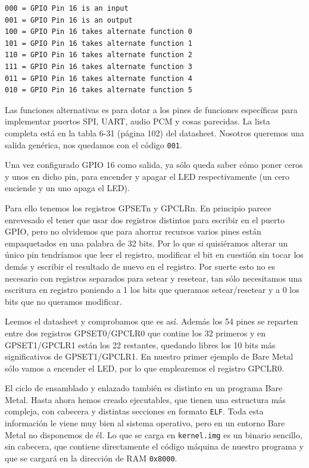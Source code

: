 \begin{lstlisting}
000 = GPIO Pin 16 is an input
001 = GPIO Pin 16 is an output
100 = GPIO Pin 16 takes alternate function 0
101 = GPIO Pin 16 takes alternate function 1
110 = GPIO Pin 16 takes alternate function 2
111 = GPIO Pin 16 takes alternate function 3
011 = GPIO Pin 16 takes alternate function 4
010 = GPIO Pin 16 takes alternate function 5
\end{lstlisting}

Las funciones alternativas es para dotar a los pines de funciones específicas
para implementar puertos SPI, UART, audio PCM y cosas parecidas. La lista completa
está en la tabla 6-31 (página 102) del datasheet. Nosotros queremos una salida
genérica, nos quedamos con el código {\tt 001}.

Una vez configurado GPIO 16 como salida, ya sólo queda saber cómo poner ceros y unos
en dicho pin, para encender y apagar el LED respectivamente (un cero enciende y un uno
apaga el LED).

Para ello tenemos los registros GPSETn y GPCLRn. En principio parece enrevesado el tener
que usar dos registros distintos para escribir en el puerto GPIO, pero no olvidemos que
para ahorrar recursos varios pines están empaquetados en una palabra de 32 bits. Por lo
que si quisiéramos alterar un único pin tendríamos que leer el registro, modificar el bit
en cuestión sin tocar los demás y escribir el resultado de nuevo en el registro. Por suerte
esto no es necesario con registros separados para setear y resetear, tan sólo necesitamos
una escritura en registro poniendo a 1 los bits que queramos setear/resetear y a 0 los bits
que no queramos modificar.

Leemos el datasheet y comprobamos que es así. Además los 54 pines se reparten entre dos
registros GPSET0/GPCLR0 que contine los 32 primeros y en GPSET1/GPCLR1 están los 22
restantes, quedando libres los 10 bits más significativos de GPSET1/GPCLR1. En nuestro
primer ejemplo de Bare Metal sólo vamos a encender el LED, por lo que emplearemos el
registro GPCLR0.

El ciclo de ensamblado y enlazado también es distinto en un programa Bare Metal. Hasta
ahora hemos creado ejecutables, que tienen una estructura más compleja, con cabecera y
distintas secciones en formato {\tt ELF}. Toda esta información le viene muy bien al
sistema operativo, pero en un entorno Bare Metal no disponemos de él. Lo que se carga
en {\tt kernel.img} es un binario sencillo, sin cabecera, que contiene directamente
el código máquina de nuestro programa y que se cargará en la dirección de RAM {\tt 0x8000}.


